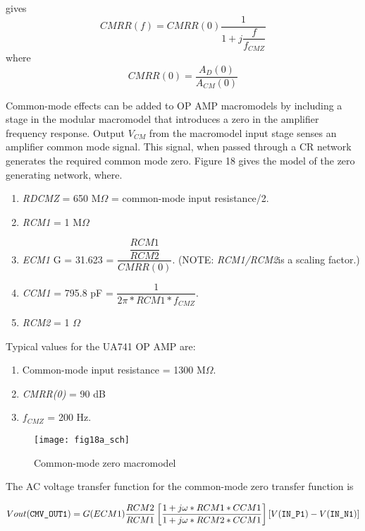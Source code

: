gives
\begin{equation}
CMRR(f)=CMRR(0)\dfrac{1}{1+j\dfrac{f}{f_{CMZ}}}
\end{equation}
where
\begin{equation}
CMRR(0)=\dfrac{A_{D}(0)}{A_{CM}(0)}
\end{equation}

Common-mode effects can be added to OP AMP macromodels by including a stage in the modular macromodel that introduces a zero in the amplifier frequency response.  Output $V_{CM}$ from the macromodel input stage senses an amplifier common mode signal.  This signal, when passed through a CR network generates the required common mode zero. Figure 18 gives the model of the zero generating network, where.

\begin{enumerate}
\item \textit{RDCMZ} = 650 M$\Omega$ = common-mode input resistance/2.
\item \textit{RCM1 } = 1 M$\Omega$
\item \textit{ECM1}    G = 31.623 = $\dfrac{\dfrac{RCM1}{RCM2}}{CMRR(0)}$. (NOTE: \textit{RCM1/RCM2}is a scaling factor.)
\item \textit{CCM1}  = 795.8 pF = $\dfrac{1}{2\pi*RCM1*f_{CMZ}}$.
\item \textit{RCM2 } = 1 $\Omega$
\end{enumerate}
Typical values for the UA741 OP AMP are:
\begin{enumerate}
\item Common-mode input resistance = 1300 M$\Omega$.
\item \textit{CMRR(0)} =  90 dB 
\item \textit{$f_{CMZ}$} =  200 Hz.
\end{enumerate}


\begin{figure}
  \centering
  \texttt{[image: fig18a\_sch]}
  \caption{Common-mode zero macromodel}
  \label{fig:opamp18a}
\end{figure}

The AC voltage transfer function for the common-mode zero transfer function is

\begin{equation}
Vout(\verb|CMV_OUT1|)=G(ECM1)\dfrac{RCM2}{RCM1}\left[  \dfrac{1+j\omega*RCM1*CCM1}{1+j\omega*RCM2*CCM1}\right] \left[ V(\verb|IN_P1|)-V(\verb|IN_N1|)\right] 
\end{equation}

